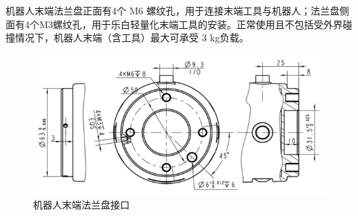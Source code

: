 机器人末端法兰盘正面有4个 M6 螺纹孔，用于连接末端工具与机器人；法兰盘侧面有4个M3螺纹孔，用于乐白轻量化末端工具的安装。正常使用且不包括受外界碰撞情况下，机器人末端（含工具）最大可承受 3 kg负载。



\begin{figure}[ht]
    \centering
    \includegraphics[width=\textwidth]{image/1-6-flange.png}
    \caption{机器人末端法兰盘接口}
    \label{fig:机器人末端法兰盘接口}
\end{figure}
